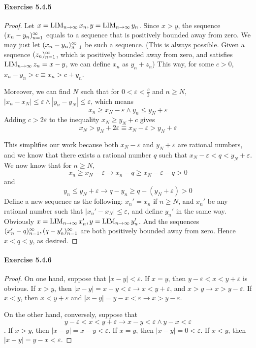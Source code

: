 \paragraph{Exercise 5.4.5} \label{exercise5.4.5}
\begin{proof}
Let $x=\operatorname*{LIM}_{n \to \infty}{x_n},y=\operatorname*{LIM}_{n \to \infty}{y_n}$. Since $x>y$, the sequence $(x_n-y_n)^\infty_{n=1}$ equals to a sequence that is positively 
bounded 
away from zero. We may just let $(x_n-y_n)^\infty_{n=1}$ be such a sequence. (This is always possible. Given a sequence 
$(z_n)^\infty_{n=1}$, which is positively bounded away from zero, and satisfies $\operatorname*{LIM}_{n \to \infty}{z_n}=x-y$, we can define $x_n$ as 
$y_n+z_n$) This way, for some $c>0$, $x_n-y_n>c\equiv x_n>c+y_n$. 

Moreover, we can find $N$ such that for $0<\varepsilon<\frac{c}{2}$ and $n\geq N$, 
$|x_n-x_N|\leq \varepsilon\wedge|y_n-y_N|\leq \varepsilon$, which means
\[
x_n\geq x_N -\varepsilon\wedge y_n \leq y_N+\varepsilon
\]
Adding $c>2\varepsilon$ to the inequality $x_N \geq y_N+c$ gives
\[
x_N>y_N+2\varepsilon \equiv x_N-\varepsilon>y_N+\varepsilon
\]

This simplifies our work because both $x_N-\varepsilon$ and $y_N+\varepsilon$ are rational numbers, and we know that 
there exists a rational number $q$ such that $x_N-\varepsilon<q<y_N+\varepsilon$. We now know that for $n\geq N$,
\[
x_n \geq x_N -\varepsilon \longrightarrow x_n-q \geq x_N-\varepsilon-q>0
\]
and
\[
y_n \leq y_N +\varepsilon \longrightarrow q-y_n \geq q-(y_N+\varepsilon)>0
\]
Define a new sequence as the following: $x_n'=x_n$ if $n\geq N$, and $x_n'$ be any rational number such that $
|x_n'-x_N|\leq \varepsilon$, and define $y_n'$ in the same way. Obviously $x=\operatorname*{LIM}_{n \to \infty}{x_n'},y=\operatorname*{LIM}_{n \to \infty}{y_n'}$. And the sequences
$(x_n'-q)^\infty_{n=1},(q-y_n')^\infty_{n=1}$ are both positively bounded away from zero. Hence $x<q<y$, as desired.
\end{proof}

\paragraph{Exercise 5.4.6} \label{exercise5.4.6}
\begin{proof}
On one hand, suppose that $|x-y|<\varepsilon$. If $x=y$, then $y-\varepsilon<x<y+\varepsilon$ is obvious. If $x>y$, then 
$|x-y|=x-y<\varepsilon \rightarrow x<y+\varepsilon$, and $x>y \rightarrow x>y-\varepsilon$. If $x<y$, then 
$x<y+\varepsilon$ and $|x-y|=y-x<\varepsilon\rightarrow x>y-\varepsilon$.

On the other hand, conversely, suppose that 
\[
y-\varepsilon<x<y+\varepsilon \rightarrow x-y<\varepsilon \wedge y-x<\varepsilon
\]. If $x>y$, then $|x-y|=x-y<\varepsilon$. If $x=y$, then $|x-y|=0<\varepsilon$. If $x<y$, then 
$|x-y|=y-x<\varepsilon$.
\end{proof}

